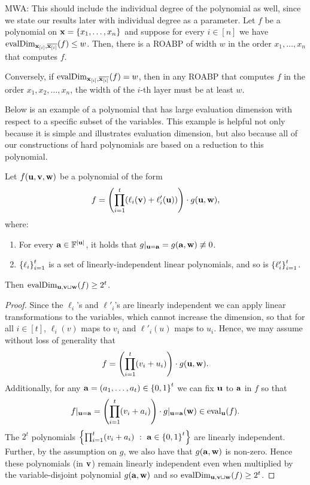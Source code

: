 \documentclass[11pt]{article}
\newcommand{\exi}{\vecx_{[i]}}
\newcommand{\Mattnote}[1]{\textcolor{OliveGreen}{MWA: #1}}
\newcommand{\BLnote}[1]{\textcolor{Blue}{BLV: #1}}
\providecommand{\DIFadd}[1]{{\protect\color{blue}\uwave{#1}}} %
\providecommand{\DIFaddbegin}{} %
\providecommand{\DIFaddend}{} %
\begin{document}
\begin{theorem}
\label{thm:eval-dim-roabp}
\Mattnote{This should include the individual degree of the polynomial as well, since we state our results later with individual degree as a parameter.}
\DIFaddbegin \DIFadd{\BLnote{I didn't understand what is it that you want to add regarding the individual degree}
  }\DIFaddend Let $f$ be a polynomial on $\mathbf{x} = \left\{ x_1,\ldots, x_n \right\}$ and suppose for every $i \in [n]$ we have $\evalDim_{\exi,\overline{\exi}}(f) \leq w$.
Then, there is a ROABP of width $w$ in the order $x_1,\ldots, x_n$ that computes $f$.

Conversely, if $\evalDim_{\exi,\overline{\exi}}(f) = w$, then in any ROABP that computes $f$ in the order $x_1, x_2, \ldots, x_n$, the width of the $i$-th layer must be at least $w$.
\end{theorem}

Below is an example of a polynomial that has large evaluation dimension with respect to a specific subset of the variables.  This example is helpful not only because it is simple and illustrates evaluation dimension, but also because all of our constructions of hard polynomials are based on a reduction to this polynomial.

\begin{lemma}
\label{lem:large-evaldim}
Let $f(\mathbf{u}, \mathbf{v}, \mathbf{w})$ be a polynomial of the form
\[
f = \left( \prod_{i=1}^t (\ell_i(\mathbf{v}) + \ell'_i(\mathbf{u})) \right) \cdot g(\mathbf{u},\mathbf{w}),
\]
where:
\begin{enumerate}
\item For every $\veca \in \F^{|\vecu|}$, it holds that $g|_{\mathbf{u}=\mathbf{a}}=g(\mathbf{a},\mathbf{w}) \not \equiv 0$.
\item $\left\{ \ell_i \right\}_{i=1}^t$ is a set of linearly-independent linear polynomials, and so is $\left\{ \ell'_i \right\}_{i=1}^t$.
\end{enumerate}
Then $\operatorname{evalDim}_{\mathbf{u}, \mathbf{v} \sqcup \mathbf{w}} (f) \ge 2^{t}$.
\end{lemma}

\begin{proof} 
Since the $\ell_i$'s and $\ell'_i$'s are linearly independent we can apply linear transformations to the variables, which cannot increase the dimension, so that for all $i \in [t]$, $\ell_i(v)$ maps to $v_i$ and $\ell'_i(u)$ maps to $u_i$.   Hence, we may assume without loss of generality that
\[
f = \left( \prod_{i=1}^t (v_i + u_i) \right) \cdot g(\mathbf{u},\mathbf{w}).
\]
Additionally, for any $\mathbf{a}=(a_1, \ldots, a_t) \in \left\{ 0,1 \right\}^t$ we can fix $\mathbf{u}$ to $\mathbf{a}$ in $f$ so that
\[
 f|_{\mathbf{u}=\mathbf{a}} = \left( \prod_{i=1}^t (v_i + a_i) \right) \cdot g|_{\mathbf{u}=\mathbf{a}}(\mathbf{w}) \in \operatorname{eval}_{\mathbf{u}}(f).
\]
The $2^t$ polynomials $\left\{  \prod_{i=1}^t (v_i + a_i) \ : \ \mathbf{a} \in \left\{ 0,1 \right\}^t \right\}$ are linearly independent. Further, by the assumption on $g$, we also have that $g(\mathbf{a},\mathbf{w})$ is non-zero. Hence these polynomials (in $\mathbf{v}$) remain linearly independent even when multiplied by the variable-disjoint polynomial $g(\mathbf{a}, \mathbf{w})$ and so $\operatorname{evalDim}_{\mathbf{u}, \mathbf{v} \sqcup \mathbf{w}} (f) \ge 2^{t}$.
\end{proof}
\end{document}
